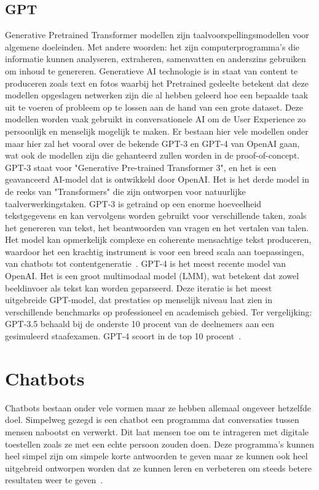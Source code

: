 \subsection{GPT}
Generative Pretrained Transformer modellen zijn taalvoorspellingsmodellen voor algemene doeleinden. Met andere woorden: het zijn computerprogramma's die informatie kunnen analyseren, extraheren, samenvatten en anderszins gebruiken om inhoud te genereren. Generatieve AI technologie is in staat van content te produceren zoals text en fotos waarbij het Pretrained gedeelte betekent dat deze modellen opgeslagen netwerken zijn die al hebben geleerd hoe een bepaalde taak uit te voeren of probleem op te lossen aan de hand van een grote dataset. Deze modellen worden vaak gebruikt in conversationele AI om de User Experience zo persoonlijk en menselijk mogelijk te maken. 
Er bestaan hier vele modellen onder maar hier zal het vooral over de bekende GPT-3 en GPT-4 van OpenAI gaan, wat ook de modellen zijn die gehanteerd zullen worden in de proof-of-concept. 
GPT-3 staat voor "Generative Pre-trained Transformer 3", en het is een geavanceerd AI-model dat is ontwikkeld door OpenAI. Het is het derde model in de reeks van "Transformers" die zijn ontworpen voor natuurlijke taalverwerkingstaken. GPT-3 is getraind op een enorme hoeveelheid tekstgegevens en kan vervolgens worden gebruikt voor verschillende taken, zoals het genereren van tekst, het beantwoorden van vragen en het vertalen van talen. Het model kan opmerkelijk complexe en coherente mensachtige tekst produceren, waardoor het een krachtig instrument is voor een breed scala aan toepassingen, van chatbots tot contentgeneratie~\autocite{Schulze2024}.
GPT-4 is het meest recente model van OpenAI. Het is een groot multimodaal model (LMM), wat betekent dat zowel beeldinvoer als tekst kan worden geparseerd. Deze iteratie is het meest uitgebreide GPT-model, dat prestaties op menselijk niveau laat zien in verschillende benchmarks op professioneel en academisch gebied. Ter vergelijking: GPT-3.5 behaald bij de onderste 10 procent van de deelnemers aan een gesimuleerd staafexamen. GPT-4 scoort in de top 10 procent~\autocite{Schulze2024}.

\section{Chatbots}
Chatbots bestaan onder vele vormen maar ze hebben allemaal ongeveer hetzelfde doel. Simpelweg gezegd is een chatbot een programma dat conversaties tussen mensen nabootst en verwerkt. Dit laat mensen toe om te intrageren met digitale toestellen zoals ze met een echte persoon zouden doen. Deze programma's kunnen heel simpel zijn om simpele korte antwoorden te geven maar ze kunnen ook heel uitgebreid ontworpen worden dat ze kunnen leren en verbeteren om steeds betere resultaten weer te geven~\autocite{oracle}. 

